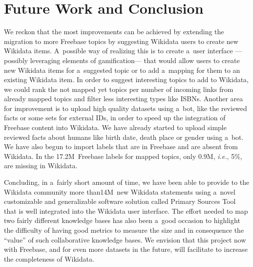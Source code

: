 \documentclass{acm_proc_article-sp}
\begin{document}
\section{Future Work and Conclusion}\label{sec:future-work-and-conclusion}

We reckon that the most improvements can be achieved
by extending the migration to more Freebase topics
by suggesting Wikidata users to create new Wikidata items.
A~possible way of realizing this is to create a~user interface%
---possibly leveraging elements of gamification---%
that would allow users to create new Wikidata items for a~suggested topic
or to add a~mapping for them to an existing Wikidata item.
In order to suggest interesting topics to add to Wikidata,
we could rank the not mapped yet topics per number of incoming links
from already mapped topics and filter less interesting types like ISBNs.
Another area for improvement is to upload high quality datasets using a~bot,
like the reviewed facts or some sets for external IDs,
in order to speed up the integration of Freebase content into Wikidata.
We have already started to upload simple reviewed facts about humans
like birth date, death place or gender using a~bot.
We have also begun to import labels that are in Freebase and are absent from Wikidata.
In the 17.2M~Freebase labels for mapped topics, only 0.9M, \emph{i.e.}, 5\%, are missing in Wikidata.

Concluding, in a~fairly short amount of time, we have been able
to provide to the Wikidata community more than\linebreak 14M~new Wikidata statements
using a~novel customizable and generalizable software solution called Primary Sources Tool
that is well integrated into the Wikidata user interface.
The effort needed to map two fairly different knowledge bases has also been a~good occasion
to highlight the difficulty of having good metrics to measure the size
and in consequence the ``value'' of such collaborative knowledge bases.
We envision that this project now with Freebase, and for even more datasets in the future,
will facilitate to increase the completeness of Wikidata.




\balancecolumns
\end{document}
